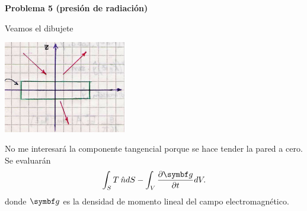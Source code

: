 \documentclass[10pt,oneside]{CBFT_book}
\begin{document}
\begin{ejemplo}{\bf Problema 5 (presión de radiación)}

Veamos el dibujete

\includegraphics[width=0.40\textwidth]{images/fig_ft1_problema5_ondas.jpg}

No me interesará la componente tangencial porque se hace tender la pared a cero.
Se evaluarán
\[
	\int_S T\nver dS - \int_V \dpar{\vb{g}}{t} dV.
\]
donde $\vb{g}$ es la densidad de momento lineal del campo electromagnético.
 
\end{ejemplo}



\end{document}
